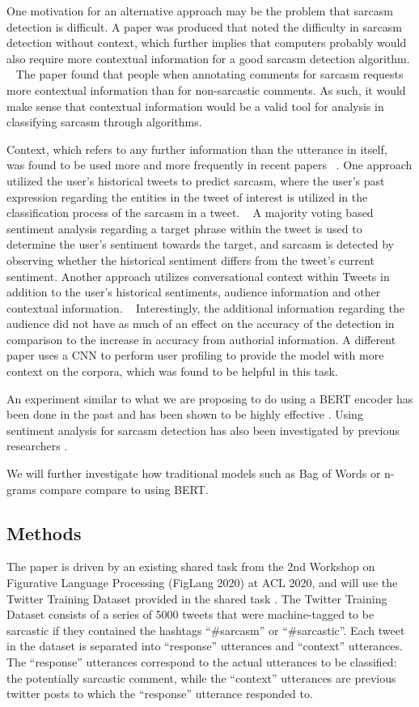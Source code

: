 \documentclass[11pt,a4paper]{article}
\begin{document}
One motivation for an alternative approach may be the problem that sarcasm detection is difficult. A paper was produced that noted the difficulty in sarcasm detection without context, which further implies that computers probably would also require more contextual information for a good sarcasm detection algorithm. ~\cite{Wallace2014HumansRC} The paper found that people when annotating comments for sarcasm requests more contextual information than for non-sarcastic comments. As such, it would make sense that contextual information would be a valid tool for analysis in classifying sarcasm through algorithms. 

Context, which refers to any further information than the utterance in itself, ~\cite{10.1145/3124420} was found to be used more and more frequently in recent papers ~\cite{Ghosh-Muresan}. One approach
utilized the user’s historical tweets to predict sarcasm, where the user’s past expression regarding the entities in the tweet of interest is utilized in the classification process
of the sarcasm in a tweet. ~\cite{khattri-etal-2015-sentiment} A majority voting based sentiment analysis regarding a target phrase within the tweet is used to determine the user’s
sentiment towards the target, and sarcasm is detected by observing whether the historical sentiment differs from the tweet’s current sentiment. Another approach utilizes
conversational context within Tweets in addition to the user’s historical sentiments, audience information and other contextual information. ~\cite{bamman2015contextualized}
Interestingly, the additional information regarding the audience did not have as much of an effect on the accuracy of the detection in comparison to the increase in accuracy from
authorial information. 
A different paper uses a CNN to perform user profiling to provide the model with more context on the corpora, which was found to be helpful in this task\cite{hazarika}.

An experiment similar to what we are proposing to do using a BERT encoder has been done in the past and has been shown to be highly effective \cite{van-hee-etal-2018-semeval}.
Using sentiment analysis for sarcasm detection has also been investigated by previous researchers \cite{abu-farha}.

We will further investigate how traditional models such as Bag of Words or n-grams compare compare to using BERT.

\subsection{Methods}
The paper is driven by an existing shared task from the 2nd Workshop on Figurative Language Processing (FigLang 2020) at ACL 2020, and will use the Twitter Training Dataset
provided in the shared task \cite{Ghosh-Muresan}. The Twitter Training Dataset consists of a series of 5000 tweets that were machine-tagged to be sarcastic if they contained the hashtags ``\#sarcasm'' or ``\#sarcastic''.  Each tweet in the dataset is separated into “response” utterances and “context” utterances. The “response” utterances correspond
to the actual utterances to be classified: the potentially sarcastic comment, while the “context” utterances are previous twitter posts to which the “response” utterance responded to. 
\end{document}
